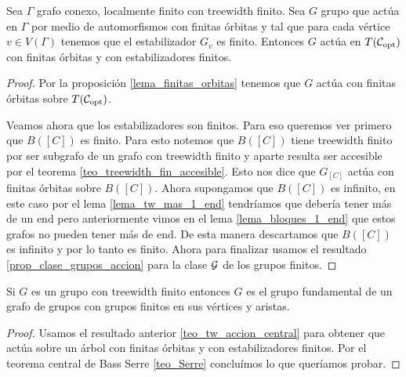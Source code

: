\documentclass[tesis.tex]{subfiles}
\begin{document}
\begin{teo}\label{teo_tw_accion_central}
	Sea $\Gamma$ grafo conexo, localmente finito con treewidth finito.
	Sea $G$ grupo que actúa en $\Gamma$ por medio de automorfismos con finitas órbitas y tal que para cada vértice $v \in V(\Gamma)$ tenemos que el estabilizador $G_{v}$ es finito.
	Entonces $G$ actúa en $T({\cal C}_{\text{opt}})$ con finitas órbitas y con estabilizadores finitos.
\end{teo}
\begin{proof}
	Por la proposición \ref{lema_finitas_orbitas} tenemos que $G$ actúa con finitas órbitas sobre $T({\cal C}_{\text{opt}})$.
	
	Veamos ahora que los estabilizadores son finitos.
	Para eso queremos ver primero que $B([C])$ es finito.
	Para esto notemos que $B([C])$ tiene treewidth finito por ser subgrafo de un grafo con treewidth finito y aparte resulta ser accesible por el teorema \ref{teo_treewidth_fin_accesible}.
	Esto nos dice que $G_{[C]}$ actúa con finitas órbitas sobre $B([C])$.
	Ahora supongamos que $B([C])$ es infinito, en este caso por el lema \ref{lema_tw_mas_1_end} tendríamos que debería tener más de un end pero anteriormente vimos en el lema \ref{lema_bloques_1_end} que estos grafos no pueden tener más de end.
	De esta manera descartamos que $B([C])$ es infinito y por lo tanto es finito.
	Ahora para finalizar usamos el resultado \ref{prop_clase_grupos_accion} para la clase ${\cal G}$ de los grupos finitos.
\end{proof}



\begin{coro}\label{coro_tw_finito_implica_pi1}
	Si $G$ es un grupo con treewidth finito entonces $G$ es el grupo fundamental de un grafo de grupos con grupos finitos en sus vértices y aristas.
\end{coro}
\begin{proof}
	Usamos el resultado anterior \ref{teo_tw_accion_central} para obtener que actúa sobre un árbol con finitas órbitas y con estabilizadores finitos.
	Por el teorema central de Bass Serre \ref{teo_Serre} concluímos lo que queríamos probar.
\end{proof}
\end{document}
